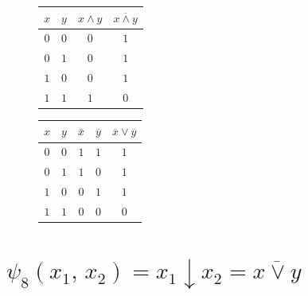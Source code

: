 \documentclass[12pt,a4paper]{article}
\theoremstyle{plain}
\theoremstyle{definition}
\theoremstyle{remark}
\numberwithin{equation}{section}
\begin{document}
\begin{figure}[H]
  \begin{minipage}[t]{0.45\textwidth}
    \vspace{0em}    
    \begin{tabularx}{\linewidth}{|C|C|C|C|}
      \hline
      $x$ & $y$ & $x \land y$ & $\overline{x \land y}$ \\
      \hline
      $0$ & $0$ & $0$ & $1$ \\
      $0$ & $1$ & $0$ & $1$ \\
      $1$ & $0$ & $0$ & $1$ \\
      $1$ & $1$ & $1$ & $0$ \\
      \hline
    \end{tabularx}
  \end{minipage} \hfill
  \begin{minipage}[t]{0.05\textwidth}
    \hspace{0em}
    \vspace{2.5em}

    \resizebox{\textwidth}{\textwidth}{$\equiv$}
  \end{minipage} \hfill
  \begin{minipage}[t]{0.45\textwidth}
    \vspace{0em}
    \begin{tabularx}{\linewidth}{|C|C|C|C|C|}
      \hline
      $x$ & $y$ & $\overline{x}$ & $\overline{y}$ & $\overline{x} \lor \overline{y}$ \\
      \hline
      $0$ & $0$ & $1$ & $1$ & $1$ \\
      $0$ & $1$ & $1$ & $0$ & $1$ \\
      $1$ & $0$ & $0$ & $1$ & $1$ \\
      $1$ & $1$ & $0$ & $0$ & $0$ \\
      \hline
    \end{tabularx}
  \end{minipage}
\end{figure}

\section{$\psi_8(x_1,\,x_2) = x_1\downarrow x_2 = \overline{x \lor y}$}
\end{document}
